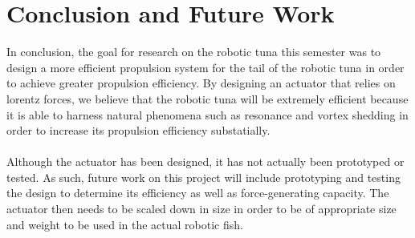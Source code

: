 \newpage
\section{Conclusion and Future Work}

In conclusion, the goal for research on the robotic tuna this semester was to design a more efficient propulsion system for the tail of the robotic tuna in order to achieve greater propulsion efficiency. By designing an actuator that relies on lorentz forces, we believe that the robotic tuna will be extremely efficient because it is able to harness natural phenomena such as resonance and vortex shedding in order to increase its propulsion efficiency substatially. \\ \\
%
Although the actuator has been designed, it has not actually been prototyped or tested. As such, future work on this project will include prototyping and testing the design to determine its efficiency as well as force-generating capacity. The actuator then needs to be scaled down in size in order to be of appropriate size and weight to be used in the actual robotic fish.